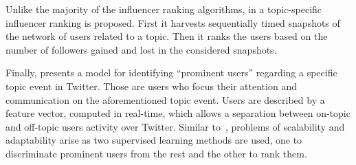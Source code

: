 Unlike the majority of the influencer ranking algorithms, in \cite{Schenk2011} a topic-specific influencer ranking is proposed. First it harvests sequentially timed snapshots of the network of users related to a topic. Then it ranks the users based on the number of followers gained and lost in the considered snapshots.

Finally, \cite{Bizid:2015:PUD:2808797.2809411} presents a model for identifying ``prominent users'' regarding a specific topic event in Twitter. Those are users who focus their attention and communication on the aforementioned topic event. Users are described by a feature vector, computed  in real-time, which allows a separation between on-topic and off-topic users activity over Twitter. Similar to~\cite{Biran2012}, problems of scalability and adaptability arise as two supervised learning methods are used, one to discriminate prominent users from the rest and the other to rank them.